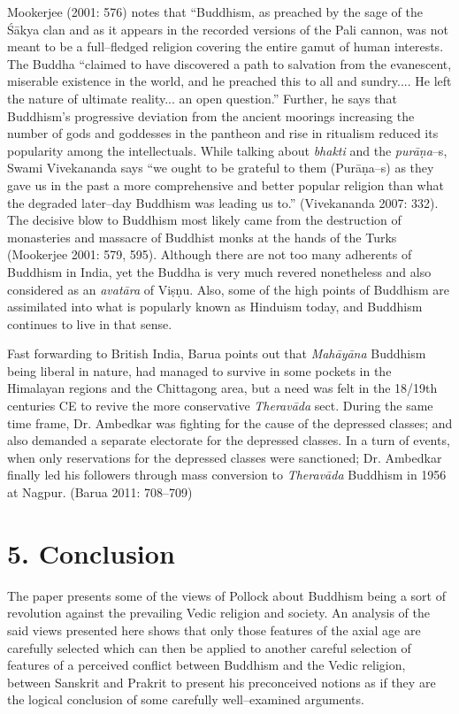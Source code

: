 Mookerjee (2001: 576) notes that “Buddhism, as preached by the sage of the Śākya clan and as it appears in the recorded versions of the Pali cannon, was not meant to be a full–fledged religion covering the entire gamut of human interests. The Buddha “claimed to have discovered a path to salvation from the evanescent, miserable existence in the world, and he preached this to all and sundry.... He left the nature of ultimate reality... an open question.” Further, he says that Buddhism’s progressive deviation from the ancient moorings increasing the number of gods and goddesses in the pantheon and rise in ritualism reduced its popularity among the intellectuals. While talking about \textit{bhakti} and the \textit{purāṇa}–s, Swami Vivekananda says “we ought to be grateful to them (Purāṇa–s) as they gave us in the past a more comprehensive and better popular religion than what the degraded later–day Buddhism was leading us to.” (Vivekananda 2007: 332). The decisive blow to Buddhism most likely came from the destruction of monasteries and massacre of Buddhist monks at the hands of the Turks (Mookerjee 2001: 579, 595). Although there are not too many adherents of Buddhism in India, yet the Buddha is very much revered nonetheless and also considered as an \textit{avatāra} of Viṣṇu. Also, some of the high points of Buddhism are assimilated into what is popularly known as Hinduism today, and Buddhism continues to live in that sense.

Fast forwarding to British India, Barua points out that \textit{Mahāyāna} Buddhism being liberal in nature, had managed to survive in some pockets in the Himalayan regions and the Chittagong area, but a need was felt in the 18/19th centuries CE to revive the more conservative \textit{Theravāda} sect. During the same time frame, Dr. Ambedkar was fighting for the cause of the depressed classes; and also demanded a separate electorate for the depressed classes. In a turn of events, when only reservations for the depressed classes were sanctioned; Dr. Ambedkar finally led his followers through mass conversion to \textit{Theravāda} Buddhism in 1956 at Nagpur. (Barua 2011: 708–709)


\section*{5. Conclusion}

The paper presents some of the views of Pollock about Buddhism being a sort of revolution against the prevailing Vedic religion and society. An analysis of the said views presented here shows that only those features of the axial age are carefully selected which can then be applied to another careful selection of features of a perceived conflict between Buddhism and the Vedic religion, between Sanskrit and Prakrit to present his preconceived notions as if they are the logical conclusion of some carefully well–examined arguments.


